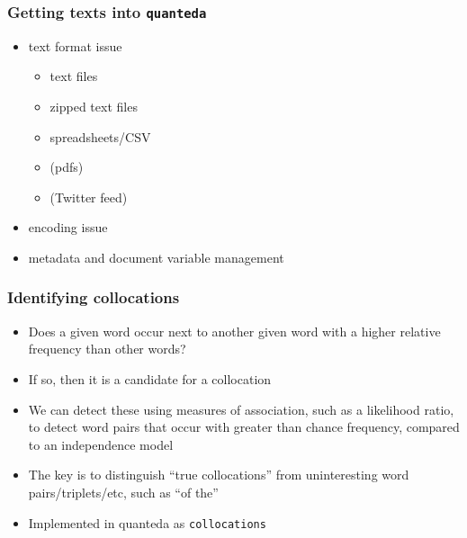 \documentclass[11pt,handout]{beamer}
\begin{document}
\begin{frame}
 \frametitle{Getting texts into \texttt{quanteda}}
 \begin{itemize}
  \item text format issue
        \begin{itemize}
         \item text files
         \item zipped text files
         \item spreadsheets/CSV
         \item (pdfs)
         \item (Twitter feed)
        \end{itemize}
  \item encoding issue
  \item metadata and document variable management
 \end{itemize}
\end{frame}


\begin{frame}
 \frametitle{Identifying collocations}
 \begin{itemize}
  \item Does a given word occur next to another given word with a
        higher relative frequency than other words?
  \item If so, then it is a candidate for a collocation
  \item We can detect these using measures of association, such as a
        likelihood ratio, to detect word pairs that occur with greater
        than chance frequency, compared to an independence model
  \item The key is to distinguish ``true collocations'' from
        uninteresting word pairs/triplets/etc, such as ``of the''
  \item Implemented in quanteda as \texttt{collocations}
 \end{itemize}
\end{frame}
\end{document}
